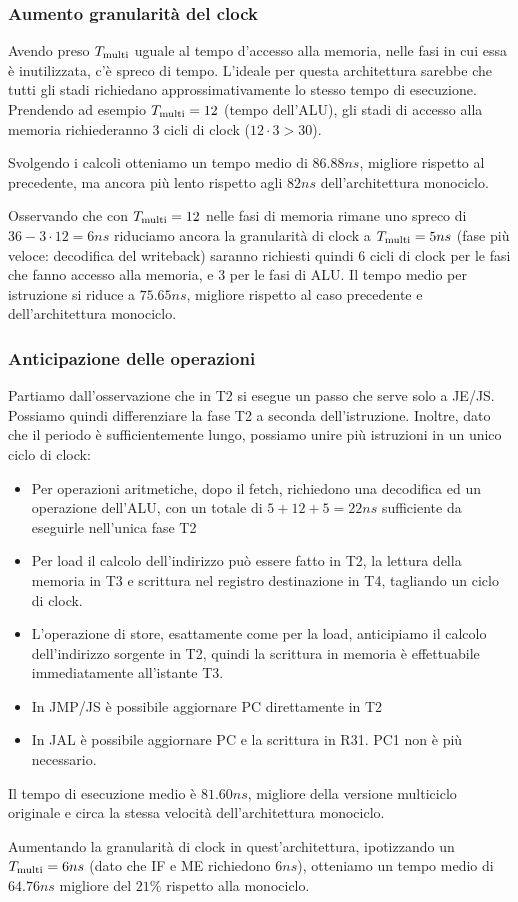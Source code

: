 \documentclass[../ace.tex]{subfiles}
\begin{document}
\subsubsection{Aumento granularità del clock}
Avendo preso $T_\text{multi}$ uguale al tempo d'accesso alla memoria, nelle fasi in cui essa è inutilizzata, c'è spreco di
tempo. L'ideale per questa architettura sarebbe che tutti gli stadi richiedano approssimativamente lo stesso tempo di
esecuzione.
Prendendo ad esempio $T_\text{multi}=12$ (tempo dell'ALU), gli stadi di accesso alla memoria richiederanno 3 cicli di clock
($12\cdot 3 > 30$).

Svolgendo i calcoli otteniamo un tempo medio di $86.88ns$, migliore rispetto al precedente, ma ancora più lento rispetto
agli $82ns$ dell'architettura monociclo.

Osservando che con $T_\text{multi}=12$ nelle fasi di memoria rimane uno spreco di $36-3\cdot 12=6ns$ riduciamo ancora la
granularità di clock a $T_\text{multi}=5ns$ (fase più veloce: decodifica del writeback)
saranno richiesti quindi 6 cicli di clock per le fasi che fanno accesso alla memoria, e 3 per le fasi di ALU.
Il tempo medio per istruzione si riduce a $75.65ns$, migliore rispetto al caso precedente e dell'architettura monociclo.
\subsubsection{Anticipazione delle operazioni}
Partiamo dall'osservazione che in T2 si esegue un passo che serve solo a JE/JS. Possiamo quindi differenziare la fase T2
a seconda dell'istruzione. Inoltre, dato che il periodo è sufficientemente lungo, possiamo unire più istruzioni in un
unico ciclo di clock:

\begin{itemize}
    \item Per operazioni aritmetiche, dopo il fetch, richiedono una decodifica ed un operazione dell'ALU, con un totale
        di $5 + 12 + 5=22ns$ sufficiente da eseguirle nell'unica fase T2
    \item Per load il calcolo dell'indirizzo può essere fatto in T2, la lettura della memoria in T3 e scrittura nel
        registro destinazione in T4, tagliando un ciclo di clock.
    \item L'operazione di store, esattamente come per la load, anticipiamo il calcolo dell'indirizzo sorgente in T2,
        quindi la scrittura in memoria è effettuabile immediatamente all'istante T3.
    \item In JMP/JS è possibile aggiornare PC direttamente in T2
    \item In JAL è possibile aggiornare PC e la scrittura in R31. PC1 non è più necessario.
\end{itemize}

Il tempo di esecuzione medio è $81.60ns$, migliore della versione multiciclo originale e circa la stessa velocità
dell'architettura monociclo.

Aumentando la granularità di clock in quest'architettura, ipotizzando un $T_\text{multi}=6 ns$ (dato che IF e ME richiedono
$6ns$), otteniamo un tempo medio di $64.76ns$ migliore del $21\%$ rispetto alla monociclo.
\end{document}

